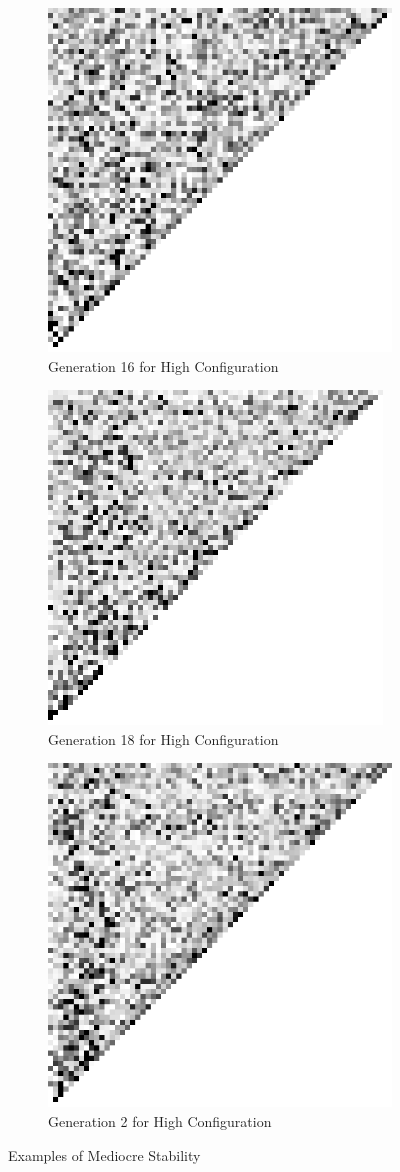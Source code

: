 \begin{figure}[H]
    \begin{subfigure}{.4\textwidth}
        \centering
        \includegraphics[width=0.4\linewidth]{images/mediocre/default_config_16.png}
        \caption{Generation 16 for High Configuration}
        \label{fig:sfig1}
    \end{subfigure}
    \begin{subfigure}{.4\textwidth}
        \centering
        \includegraphics[width=0.4\linewidth]{images/mediocre/high_config_18.png}
        \caption{Generation 18 for High Configuration}
        \label{fig:sfig2}
    \end{subfigure}
    \begin{subfigure}{.4\textwidth}
        \centering
        \includegraphics[width=0.4\linewidth]{images/mediocre/high_config_2.png}
        \caption{Generation 2 for High Configuration}
        \label{fig:sfig4}
    \end{subfigure}
    \caption{Examples of Mediocre Stability}
    \label{ap_med}
\end{figure}


